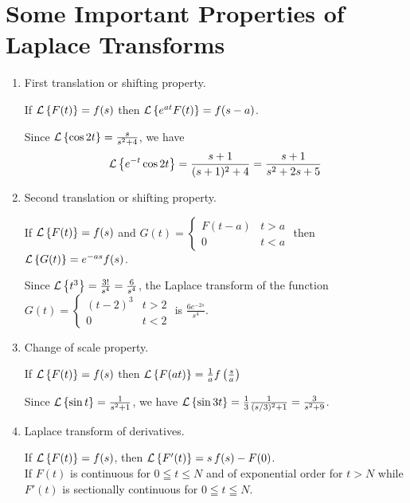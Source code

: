 \documentclass[../main-sheet.tex]{subfiles}
\begin{document}
\section{Some Important Properties of Laplace Transforms}
\begin{enumerate}
    \item First translation or shifting property.
        \begin{thm}
            If $ \mathcal{L}\left\{ F(t)\right\}=f(s) $ then $ \mathcal{L}\left\{ e^{at}F(t)\right\}=f(s-a) $.
        \end{thm}
        \begin{ex}
            Since $ \mathcal{L}\left\{ \cos 2t\right\}=\frac{s}{s^2+4} $, we have
            \[\mathcal{L}\left\{ e^{-t}\cos 2t\right\}=\frac{s+1}{(s+1)^2+4}=\frac{s+1}{s^2+2s+5}\]
        \end{ex}
    \item Second translation or shifting property.
        \begin{thm}
            If $ \mathcal{L}\left\{ F(t)\right\}=f(s) $ and $ G(t)=\begin{cases}
                F(t-a) & t>a\\
                0 & t<a
            \end{cases} $ then $ \mathcal{L}\left\{ G(t)\right\}=e^{-as}f(s) $.
        \end{thm}
    \begin{ex}
        Since $ \mathcal{L}\left\{ t^3\right\}=\frac{3!}{s^4}=\frac{6}{s^4} $, the Laplace transform of the function $ G(t)=\begin{cases}
            (t-2)^3&t>2\\
            0&t<2
        \end{cases} $ is $ \frac{6e^{-2s}}{s^4} $.
    \end{ex}
    \item Change of scale property.
        \begin{thm}
            If $ \mathcal{L}\left\{ F(t)\right\}=f(s) $ then $ \mathcal{L}\left\{ F(at)\right\}=\frac{1}{a}f\left( \frac{s}{a} \right) $
        \end{thm}
        \begin{ex}
            Since $ \mathcal{L}\left\{ \sin t\right\}=\frac{1}{s^2+1} $, we have $ \mathcal{L}\left\{ \sin 3t\right\}=\frac{1}{3}\frac{1}{(s/3)^2+1}=\frac{3}{s^2+9} $.
        \end{ex}
    \item Laplace transform of derivatives.
        \begin{thm}\label{thm:lapder}
            If $ \mathcal{L}\left\{ F(t)\right\}=f(s) $, then $ \mathcal{L}\left\{ F' (t)\right\}=s\,f(s)-F(0) $.\\
            If $ F(t) $ is continuous for $ 0\leqq t \leq N $ and of exponential order for $ t>N $ while $ F'(t) $ is sectionally continuous for $ 0\leqq t\leqq N $.

\end{thm}
\end{enumerate}
\end{document}
